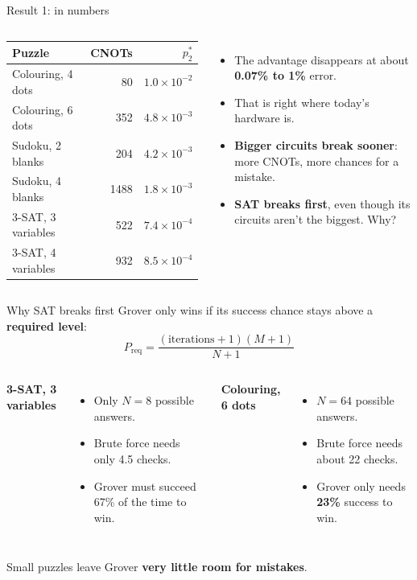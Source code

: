 \documentclass[aspectratio=169,11pt]{beamer}
\begin{document}
\begin{frame}{Result 1: in numbers}
\begin{columns}[T]
\begin{tabular}{@{}lrr@{}}
\toprule
Puzzle & CNOTs & $p_2^*$ \\
\midrule
Colouring, 4 dots & 80 & $1.0\times10^{-2}$ \\
Colouring, 6 dots & 352 & $4.8\times10^{-3}$ \\
Sudoku, 2 blanks & 204 & $4.2\times10^{-3}$ \\
Sudoku, 4 blanks & 1488 & $1.8\times10^{-3}$ \\
3-SAT, 3 variables & 522 & $7.4\times10^{-4}$ \\
3-SAT, 4 variables & 932 & $8.5\times10^{-4}$ \\
\bottomrule
\end{tabular}
\begin{itemize}
\item The advantage disappears at about \textbf{0.07\% to 1\%} error.
\item That is \alert{right where today's hardware is}.
\item \textbf{Bigger circuits break sooner}: more CNOTs, more chances for a mistake.
\item \textbf{SAT breaks first}, even though its circuits aren't the biggest. Why?
\end{itemize}
\end{columns}
\end{frame}

\begin{frame}{Why SAT breaks first}
Grover only wins if its success chance stays above a \textbf{required level}:
\[
P_\text{req} = \frac{(\text{iterations}+1)(M+1)}{N+1}
\]
\begin{columns}[T]
\textbf{3-SAT, 3 variables}
\begin{itemize}
\item Only $N=8$ possible answers.
\item Brute force needs only 4.5 checks.
\item Grover must succeed \alert{67\%} of the time to win.
\end{itemize}
\textbf{Colouring, 6 dots}
\begin{itemize}
\item $N=64$ possible answers.
\item Brute force needs about 22 checks.
\item Grover only needs \textbf{23\%} success to win.
\end{itemize}
\end{columns}
\vspace{0.6em}
Small puzzles leave Grover \textbf{very little room for mistakes}.
\end{frame}
\end{document}
